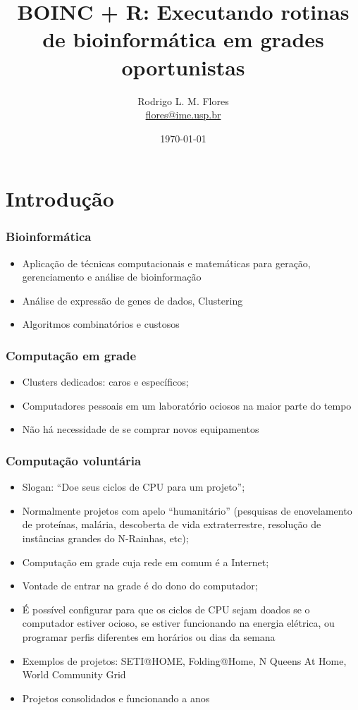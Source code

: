 \documentclass{beamer}
\title{BOINC + R: Executando rotinas de bioinformática em grades oportunistas}
\author{Rodrigo L. M. Flores \\ \url{flores@ime.usp.br}}
\institute{Instituto de Matemática e Estatística\\Universidade de São Paulo}
\begin{document}
\date{\today}

\frame{\titlepage}

\frame{\tableofcontents}

\section{Introdução}

\begin{frame}
  \frametitle{Bioinformática}
  \begin{itemize}
    \item Aplicação de técnicas computacionais e matemáticas para geração, gerenciamento e análise de bioinformação 
    \item Análise de expressão de genes de dados, Clustering
    \item Algoritmos combinatórios e custosos
  \end{itemize} 
\end{frame}

\begin{frame}
  \frametitle{Computação em grade}
  \begin{itemize}
    \item Clusters dedicados: caros e específicos;
    \item Computadores pessoais em um laboratório ociosos na maior parte do tempo
    \item Não há necessidade de se comprar novos equipamentos
  \end{itemize}
\end{frame}

\begin{frame}
  \frametitle{Computação voluntária}
  \begin{itemize}
    \item Slogan: ``Doe seus ciclos de CPU para um projeto'';
    \item Normalmente projetos com apelo ``humanitário'' (pesquisas de enovelamento de proteínas, malária, descoberta de vida extraterrestre, resolução de instâncias grandes do N-Rainhas, etc);
    \item Computação em grade cuja rede em comum é a Internet; 
    \item Vontade de entrar na grade é do dono do computador;
    \item É possível configurar para que os ciclos de CPU sejam doados se o computador estiver ocioso, se estiver funcionando na energia elétrica, ou programar perfis diferentes em horários ou dias da semana
    \item Exemplos de projetos: SETI@HOME, Folding@Home, N Queens At Home, World Community Grid
    \item Projetos consolidados e funcionando a anos
  \end{itemize}
\end{frame}
\end{document}
